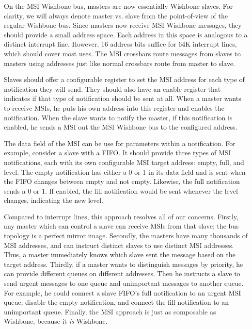 \documentclass[a4paper]{jacow}
\begin{document}
On the MSI Wishbone bus, masters are now essentially Wishbone slaves.
For clarity, we will always denote master vs. slave from the point-of-view of
the regular Wishbone bus.
Since masters now receive MSI Wishbone messages, they should provide a small address space.
Each address in this space is analogous to a distinct interrupt line.
However, 16 address bits suffice for 64K interrupt lines, which should cover most uses.
The MSI crossbars route messages from slaves to masters using addresses just like normal
crossbars route from master to slave.

Slaves should offer a configurable register to set the MSI address for each type of
notification they will send.
They should also have an enable register that indicates if that type of
notification should be sent at all.
When a master wants to receive MSIs, he puts his own address into this register
and enables the notification.
When the slave wants to notify the master, if this notification is enabled,
he sends a MSI out the MSI Wishbone bus to the configured address.

The data field of the MSI can be use for parameters within a notification.
For example, consider a slave with a FIFO.
It should provide three types of MSI notifications, each with its own
configurable MSI target address: empty, full, and level.
The empty notification has either a 0 or 1 in its data field and is sent
when the FIFO changes between empty and not empty.
Likewise, the full notification sends a 0 or 1.
If enabled, the fill notification would be sent whenever the level
changes, indicating the new level.

Compared to interrupt lines, this approach resolves all of our concerns.
Firstly, any master which can control a slave can receive MSIs from that slave;
the bus topology is a perfect mirror image.
Secondly, the masters have many thousands of MSI addresses, and can
instruct distinct slaves to use distinct MSI addresses.
Thus, a master immediately knows which slave sent the message based on the target address.
Thirdly, if a master wants to distinguish messages by priority, 
he can provide different queues on different addresses.
Then he instructs a slave to send urgent messages to one queue and
unimportant messages to another queue.
For example, he could connect a slave FIFO's full notification to an urgent MSI queue,
disable the empty notification, and connect the fill notification to an
unimportant queue.
Finally, the MSI approach is just as composable as Wishbone,
because it \emph{is} Wishbone.
\end{document}
